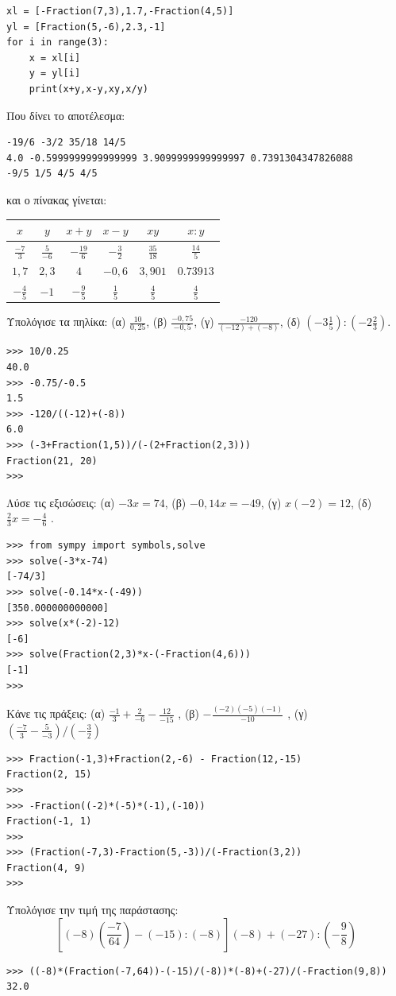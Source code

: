 \begin{lstlisting}
xl = [-Fraction(7,3),1.7,-Fraction(4,5)]
yl = [Fraction(5,-6),2.3,-1]
for i in range(3):
    x = xl[i]
    y = yl[i]
    print(x+y,x-y,xy,x/y)
\end{lstlisting}
Που δίνει το αποτέλεσμα:
\begin{lstlisting}
-19/6 -3/2 35/18 14/5
4.0 -0.5999999999999999 3.9099999999999997 0.7391304347826088
-9/5 1/5 4/5 4/5
\end{lstlisting}
και ο πίνακας γίνεται:
\begin{table}[h]
\begin{tabular}{|c|c|c|c|c|c|}
\hline
$x$&$y$&$x+y$&$x-y$&$xy$&$x:y$\\\hline
$\frac{-7}{3}$&$\frac{5}{-6}$&$-\frac{19}{6}$ & $-\frac{3}{2}$ &$\frac{35}{18}$ & $\frac{14}{5}$\\\hline
$1,7$&$2,3$&$4$&$-0,6$ &$3,901$ & $0.73913$\\\hline
$-\frac{4}{5}$&$-1$&$-\frac{9}{5}$&$\frac{1}{5}$&$\frac{4}{5}$ & $\frac{4}{5}$ \\\hline
\end{tabular}
\end{table}
\begin{exercise}
 Υπολόγισε τα πηλίκα:
(α) $\frac{10}{0,25}$, (β) $\frac{-0,75}{-0,5}$, (γ) $\frac{-120}{(-12)+(-8)}$, (δ) $\left(-3\frac{1}{5}\right):\left(-2\frac{2}{3}\right)$.
\end{exercise}
\begin{lstlisting}
>>> 10/0.25
40.0
>>> -0.75/-0.5
1.5
>>> -120/((-12)+(-8))
6.0
>>> (-3+Fraction(1,5))/(-(2+Fraction(2,3)))
Fraction(21, 20)
>>>
\end{lstlisting}
\begin{exercise}
Λύσε  τις εξισώσεις:  (α) $-3x  = 74$,  (β) $-0,14x = -49$, (γ) $x(-2)  = 12$,  (δ)  $\frac{2}{3}x  = - \frac{4}{6}$ .
\end{exercise}
\begin{lstlisting}
>>> from sympy import symbols,solve
>>> solve(-3*x-74)
[-74/3]
>>> solve(-0.14*x-(-49))
[350.000000000000]
>>> solve(x*(-2)-12)
[-6]
>>> solve(Fraction(2,3)*x-(-Fraction(4,6)))
[-1]
>>>
\end{lstlisting}
\begin{exercise}
Kάνε  τις πράξεις:  (α) $\frac{-1}{3}+\frac{2}{-6} - \frac{12}{-15}$ ,    (β) $-\frac{ (-2)(-5)(-1)}{-10}$ , (γ)  $\left( \frac{-7}{3}-\frac{5}{-3}\right)/\left(-\frac{3}{2}\right)$
\end{exercise}
\begin{lstlisting}
>>> Fraction(-1,3)+Fraction(2,-6) - Fraction(12,-15)
Fraction(2, 15)
>>>
>>> -Fraction((-2)*(-5)*(-1),(-10))
Fraction(-1, 1)
>>>
>>> (Fraction(-7,3)-Fraction(5,-3))/(-Fraction(3,2))
Fraction(4, 9)
>>>
\end{lstlisting}
\begin{exercise}
Υπολόγισε την τιμή  της παράστασης: 
$$\left[(-8)\left(\frac{-7}{64}\right)-(-15)  : (-8)\right](-8)+(-27):(-\frac{9}{8})$$
\end{exercise}
\begin{lstlisting}
>>> ((-8)*(Fraction(-7,64))-(-15)/(-8))*(-8)+(-27)/(-Fraction(9,8))
32.0
\end{lstlisting}
